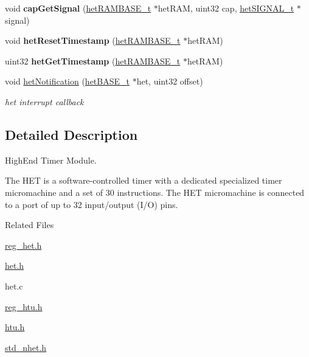 \begin{DoxyCompactItemize}
\item 
\mbox{\label{group__HET_gad322c959fbadb8091ba05305f4c69b17}} 
void {\bfseries cap\+Get\+Signal} (\mbox{\hyperlink{reg__het_8h_aff6a3de4d5a894a32134243e0d87bb32}{het\+R\+A\+M\+B\+A\+S\+E\+\_\+t}} $\ast$het\+R\+AM, uint32 cap, \mbox{\hyperlink{het_8h_a87f46a75dd7fcc91f1664567ea27ea14}{het\+S\+I\+G\+N\+A\+L\+\_\+t}} $\ast$signal)
\item 
\mbox{\label{group__HET_gaa1e23082226fa329122c36e4f9894a5a}} 
void {\bfseries het\+Reset\+Timestamp} (\mbox{\hyperlink{reg__het_8h_aff6a3de4d5a894a32134243e0d87bb32}{het\+R\+A\+M\+B\+A\+S\+E\+\_\+t}} $\ast$het\+R\+AM)
\item 
\mbox{\label{group__HET_ga947aeb9cd4b983151c895e86f8558383}} 
uint32 {\bfseries het\+Get\+Timestamp} (\mbox{\hyperlink{reg__het_8h_aff6a3de4d5a894a32134243e0d87bb32}{het\+R\+A\+M\+B\+A\+S\+E\+\_\+t}} $\ast$het\+R\+AM)
\item 
void \mbox{\hyperlink{group__HET_gaffe14e0c36fcb4ca9dd388e58a97b75f}{het\+Notification}} (\mbox{\hyperlink{reg__het_8h_ad33493e7f48cca3db8ffa5c71289ba1a}{het\+B\+A\+S\+E\+\_\+t}} $\ast$het, uint32 offset)
\begin{DoxyCompactList}\small\item\em het interrupt callback \end{DoxyCompactList}\end{DoxyCompactItemize}


\subsection{Detailed Description}
High\+End Timer Module. 

The H\+ET is a software-\/controlled timer with a dedicated specialized timer micromachine and a set of 30 instructions. The H\+ET micromachine is connected to a port of up to 32 input/output (I/O) pins.

Related Files
\begin{DoxyItemize}
\item \mbox{\hyperlink{reg__het_8h}{reg\+\_\+het.\+h}}
\item \mbox{\hyperlink{het_8h}{het.\+h}}
\item het.\+c
\item \mbox{\hyperlink{reg__htu_8h}{reg\+\_\+htu.\+h}}
\item \mbox{\hyperlink{htu_8h}{htu.\+h}}
\item \mbox{\hyperlink{std__nhet_8h}{std\+\_\+nhet.\+h}} 
\end{DoxyItemize}

